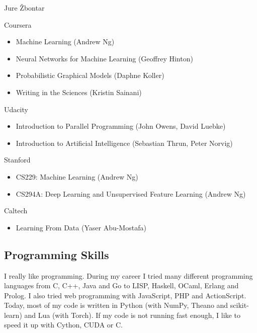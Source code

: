 \documentclass[12pt,a4paper]{article}
\begin{document}
\begin{cv}{Jure \v{Z}bontar}
\begin{cvlist}{}
\item[Coursera] 
\begin{itemize}
\item Machine Learning (Andrew Ng)
\item Neural Networks for Machine Learning (Geoffrey Hinton)
\item Probabilistic Graphical Models (Daphne Koller)
\item Writing in the Sciences (Kristin Sainani)
\end{itemize}

\item[Udacity] 
\begin{itemize}
\item Introduction to Parallel Programming (John Owens, David Luebke)
\item Introduction to Artificial Intelligence (Sebastian Thrun, Peter Norvig)
\end{itemize}

\item[Stanford] 
\begin{itemize}
\item CS229: Machine Learning (Andrew Ng)
\item CS294A: Deep Learning and Unsupervised Feature Learning (Andrew Ng)
\end{itemize}

\item[Caltech] 
\begin{itemize}
\item Learning From Data (Yaser Abu-Mostafa)
\end{itemize}

\end{cvlist}

\subsection*{Programming Skills}
I really like programming. During my career I tried many different
programming languages from C, C++, Java and Go to LISP, Haskell, OCaml,
Erlang and Prolog. I also tried web programming with JavaScript, PHP and
ActionScript. Today, most of my code is written in Python (with NumPy,
Theano and scikit-learn) and Lua (with Torch). If my code is not running fast enough,
I like to speed it up with Cython, CUDA or C.
\end{cv}

\nocite{vzbontar2014computing,demvsar2013orange,zbontar2012team}
{}

\end{document}
